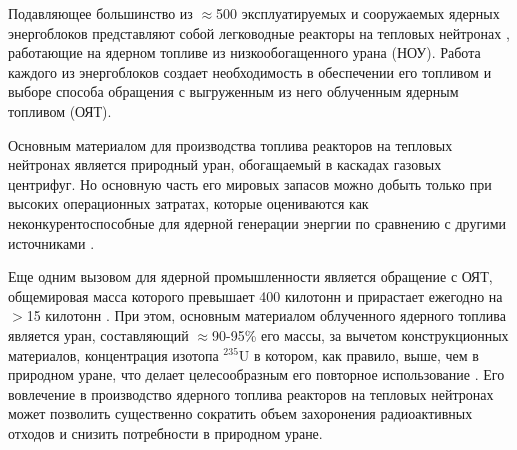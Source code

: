 {\actuality}

Подавляющее большинство из $\approx$500 эксплуатируемых и сооружаемых ядерных энергоблоков представляют собой легководные реакторы на тепловых нейтронах \cite{PRISHome}, работающие на ядерном топливе из низкообогащенного урана (НОУ). Работа каждого из энергоблоков создает необходимость в обеспечении его топливом и выборе способа обращения с выгруженным из него облученным ядерным топливом (ОЯТ).

Основным материалом для производства топлива реакторов на тепловых нейтронах является природный уран, обогащаемый в каскадах газовых центрифуг. Но основную часть его мировых запасов можно добыть только при высоких операционных затратах, которые оцениваются как неконкурентоспособные для ядерной генерации энергии по сравнению с другими источниками \cite{Uranium2022,WorldDistributionUranium2018,hartardCompetitionConflictsResource2015}. 

Еще одним вызовом для ядерной промышленности является обращение с ОЯТ, общемировая масса которого превышает 400 килотонн и прирастает ежегодно на $>$15 килотонн \cite{kaygorodcevProblemyPerspektivyRazvitiya2021,UseReprocessedUranium2020WNA}. При этом, основным материалом облученного ядерного топлива является уран, составляющий $\approx$90-95\% его массы, за вычетом конструкционных материалов, концентрация изотопа $^{235}$U в котором, как правило, выше, чем в природном уране, что делает целесообразным его повторное использование \cite{NikipelovNikipelovSudby}. Его вовлечение в производство ядерного топлива реакторов на тепловых нейтронах может позволить существенно сократить объем захоронения радиоактивных отходов и снизить потребности в природном уране.

